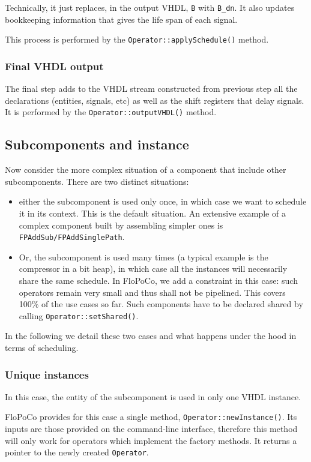 \documentclass{article}
\begin{document}
Technically, it just replaces, in the output VHDL,   \verb!B! with \verb!B_dn!.
It also updates bookkeeping information that gives the life span of each signal.

This process is performed by the \verb!Operator::applySchedule()! method.

\subsubsection{Final VHDL output}
The final step adds to the VHDL stream constructed from previous step all the declarations (entities, signals, etc) as well as the shift registers that delay signals.
It is performed by the \verb!Operator::outputVHDL()! method.

\subsection{Subcomponents and instance}

Now consider the more complex situation of a component that include other subcomponents.
There are two distinct situations:
\begin{itemize}
\item either the subcomponent is used only once, in which case we want to schedule it in its context.
  This is the default situation.
  An extensive example of a complex component built by assembling simpler ones is \texttt{FPAddSub/FPAddSinglePath}.
  
\item Or, the subcomponent is used many times (a typical example is the compressor in a bit heap), in which case all the instances will necessarily share the same schedule.
  In FloPoCo, we add a constraint in this case: such operators remain very small and thus shall not be pipelined.
  This covers 100\% of the use cases so far.
  Such components have to be declared shared by calling \texttt{Operator::setShared()}.
\end{itemize}

In the following we detail these two cases and what happens under the hood in terms of scheduling.


\subsubsection{Unique instances}
In this case, the entity of the subcomponent is used in only one VHDL instance.

FloPoCo provides for this case a single method, \verb!Operator::newInstance()!.
Its inputs are those provided on the command-line interface, therefore this method will only work for operators which implement the factory methods.
It returns a pointer to the newly created \texttt{Operator}.
\end{document}
